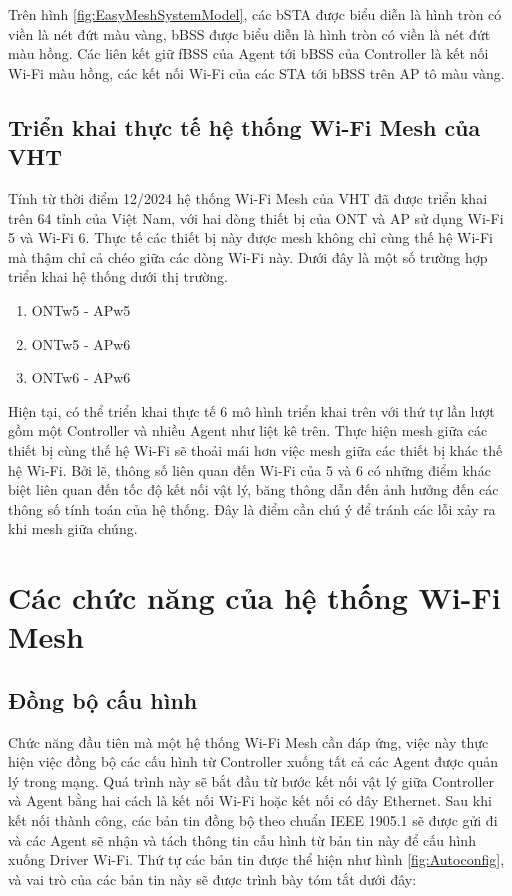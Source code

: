 Trên hình \ref{fig:EasyMeshSystemModel}, các bSTA được biểu diễn là hình tròn có viền là nét đứt màu vàng, bBSS được biểu diễn là hình tròn có viền là nét đứt màu hồng. Các liên kết giữ fBSS của Agent tới bBSS của Controller là kết nối Wi-Fi màu hồng, các kết nối Wi-Fi của các STA tới bBSS trên AP tô màu vàng.

\subsection{Triển khai thực tế hệ thống Wi-Fi Mesh của VHT}
Tính từ thời điểm 12/2024 hệ thống Wi-Fi Mesh của VHT đã được triển khai trên 64 tỉnh của Việt Nam, với hai dòng thiết bị của ONT và AP sử dụng Wi-Fi 5 và Wi-Fi 6. Thực tế các thiết bị này được mesh không chỉ cùng thế hệ Wi-Fi mà thậm chỉ cả chéo giữa các dòng Wi-Fi này. Dưới đây là một số trường hợp triển khai hệ thống dưới thị trường.

\begin{enumerate}
    \item ONTw5 - APw5
    \item ONTw5 - APw6
    \item ONTw6 - APw6
\end{enumerate}

Hiện tại, có thể triển khai thực tế 6 mô hình triển khai trên với thứ tự lần lượt gồm một Controller và nhiều Agent như liệt kê trên. Thực hiện mesh giữa các thiết bị cùng thế hệ Wi-Fi sẽ thoải mái hơn việc mesh giữa các thiết bị khác thế hệ Wi-Fi. Bởi lẽ, thông số liên quan đến Wi-Fi của 5 và 6 có những điểm khác biệt liên quan đến tốc độ kết nối vật lý, băng thông dẫn đến ảnh hưởng đến các thông số tính toán của hệ thống. Đây là điểm cần chú ý để tránh các lỗi xảy ra khi mesh giữa chúng.

\section{Các chức năng của hệ thống Wi-Fi Mesh}
\subsection{Đồng bộ cấu hình}

Chức năng đầu tiên mà một hệ thống Wi-Fi Mesh cần đáp ứng, việc này thực hiện việc đồng bộ các cấu hình từ Controller xuống tất cả các Agent được quản lý trong mạng. Quá trình này sẽ bắt đầu từ bước kết nối vật lý giữa Controller và Agent bằng hai cách là kết nối Wi-Fi hoặc kết nối có dây Ethernet. Sau khi kết nối thành công, các bản tin đồng bộ theo chuẩn IEEE 1905.1 sẽ được gửi đi và các Agent sẽ nhận và tách thông tin cấu hình từ bản tin này để cấu hình xuống Driver Wi-Fi. Thứ tự các bản tin được thể hiện như hình \ref{fig:Autoconfig}, và vai trò của các bản tin này sẽ được trình bày tóm tắt dưới đây:

